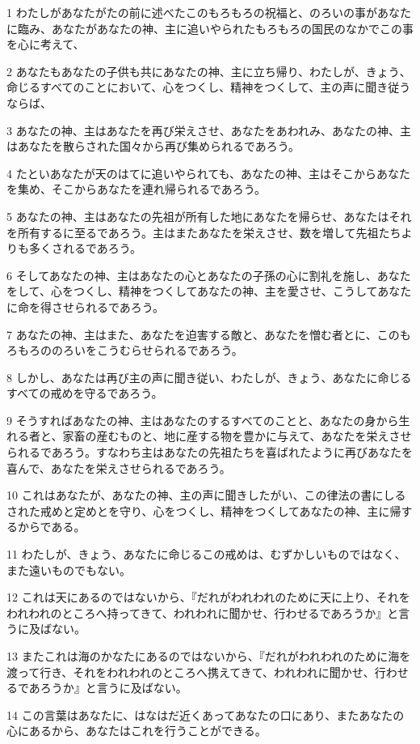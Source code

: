 \par 1 わたしがあなたがたの前に述べたこのもろもろの祝福と、のろいの事があなたに臨み、あなたがあなたの神、主に追いやられたもろもろの国民のなかでこの事を心に考えて、
\par 2 あなたもあなたの子供も共にあなたの神、主に立ち帰り、わたしが、きょう、命じるすべてのことにおいて、心をつくし、精神をつくして、主の声に聞き従うならば、
\par 3 あなたの神、主はあなたを再び栄えさせ、あなたをあわれみ、あなたの神、主はあなたを散らされた国々から再び集められるであろう。
\par 4 たといあなたが天のはてに追いやられても、あなたの神、主はそこからあなたを集め、そこからあなたを連れ帰られるであろう。
\par 5 あなたの神、主はあなたの先祖が所有した地にあなたを帰らせ、あなたはそれを所有するに至るであろう。主はまたあなたを栄えさせ、数を増して先祖たちよりも多くされるであろう。
\par 6 そしてあなたの神、主はあなたの心とあなたの子孫の心に割礼を施し、あなたをして、心をつくし、精神をつくしてあなたの神、主を愛させ、こうしてあなたに命を得させられるであろう。
\par 7 あなたの神、主はまた、あなたを迫害する敵と、あなたを憎む者とに、このもろもろののろいをこうむらせられるであろう。
\par 8 しかし、あなたは再び主の声に聞き従い、わたしが、きょう、あなたに命じるすべての戒めを守るであろう。
\par 9 そうすればあなたの神、主はあなたのするすべてのことと、あなたの身から生れる者と、家畜の産むものと、地に産する物を豊かに与えて、あなたを栄えさせられるであろう。すなわち主はあなたの先祖たちを喜ばれたように再びあなたを喜んで、あなたを栄えさせられるであろう。
\par 10 これはあなたが、あなたの神、主の声に聞きしたがい、この律法の書にしるされた戒めと定めとを守り、心をつくし、精神をつくしてあなたの神、主に帰するからである。
\par 11 わたしが、きょう、あなたに命じるこの戒めは、むずかしいものではなく、また遠いものでもない。
\par 12 これは天にあるのではないから、『だれがわれわれのために天に上り、それをわれわれのところへ持ってきて、われわれに聞かせ、行わせるであろうか』と言うに及ばない。
\par 13 またこれは海のかなたにあるのではないから、『だれがわれわれのために海を渡って行き、それをわれわれのところへ携えてきて、われわれに聞かせ、行わせるであろうか』と言うに及ばない。
\par 14 この言葉はあなたに、はなはだ近くあってあなたの口にあり、またあなたの心にあるから、あなたはこれを行うことができる。
